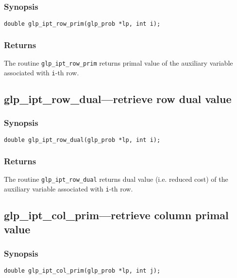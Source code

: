 \subsubsection*{Synopsis}

\begin{verbatim}
double glp_ipt_row_prim(glp_prob *lp, int i);
\end{verbatim}

\subsubsection*{Returns}

The routine \verb|glp_ipt_row_prim| returns primal value of the
auxiliary variable associated with \verb|i|-th row.

\newpage

\subsection{glp\_ipt\_row\_dual---retrieve row dual value}

\subsubsection*{Synopsis}

\begin{verbatim}
double glp_ipt_row_dual(glp_prob *lp, int i);
\end{verbatim}

\subsubsection*{Returns}

The routine \verb|glp_ipt_row_dual| returns dual value (i.e. reduced
cost) of the auxiliary variable associated with \verb|i|-th row.

\subsection{glp\_ipt\_col\_prim---retrieve column primal value}

\subsubsection*{Synopsis}

\begin{verbatim}
double glp_ipt_col_prim(glp_prob *lp, int j);
\end{verbatim}

